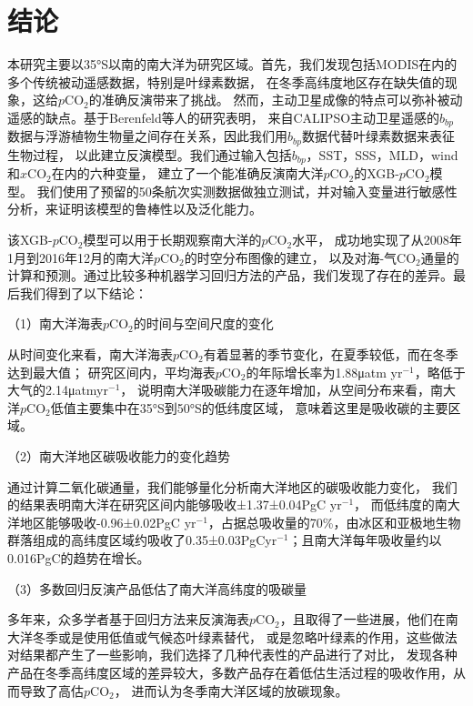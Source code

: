\section{结论}
本研究主要以35°S以南的南大洋为研究区域。首先，我们发现包括MODIS在内的多个传统被动遥感数据，特别是叶绿素数据，
在冬季高纬度地区存在缺失值的现象，这给$p\mathrm{CO_2}$的准确反演带来了挑战。
然而，主动卫星成像的特点可以弥补被动遥感的缺点。基于Berenfeld等人\cite{bbp_Annual_2017,chen2017estimating}的研究表明，
来自CALIPSO主动卫星遥感的$b_{bp}$数据与浮游植物生物量之间存在关系，因此我们用$b_{bp}$数据代替叶绿素数据来表征生物过程，
以此建立反演模型。我们通过输入包括$b_{bp}$，SST，SSS，MLD，wind和$x\mathrm{CO_2}$在内的六种变量，
建立了一个能准确反演南大洋$p\mathrm{CO_2}$的XGB-$p\mathrm{CO_2}$模型。
我们使用了预留的50条航次实测数据做独立测试，并对输入变量进行敏感性分析，来证明该模型的鲁棒性以及泛化能力。

该XGB-$p\mathrm{CO_2}$模型可以用于长期观察南大洋的$p\mathrm{CO_2}$水平，
成功地实现了从2008年1月到2016年12月的南大洋$p\mathrm{CO_2}$的时空分布图像的建立，
以及对海-气$\mathrm{CO_2}$通量的计算和预测。通过比较多种机器学习回归方法的产品，我们发现了存在的差异。最后我们得到了以下结论：

（1）南大洋海表$p\mathrm{CO_2}$的时间与空间尺度的变化 

从时间变化来看，南大洋海表$p\mathrm{CO_2}$有着显著的季节变化，在夏季较低，而在冬季达到最大值；
研究区间内，平均海表$p\mathrm{CO_2}$的年际增长率为1.88μatm yr$^{-1}$，略低于大气的2.14μatmyr$^{-1}$，
说明南大洋吸碳能力在逐年增加，从空间分布来看，南大洋$p\mathrm{CO_2}$低值主要集中在35°S到50°S的低纬度区域，
意味着这里是吸收碳的主要区域。

（2）南大洋地区碳吸收能力的变化趋势

通过计算二氧化碳通量，我们能够量化分析南大洋地区的碳吸收能力变化，
我们的结果表明南大洋在研究区间内能够吸收±1.37±0.04PgC yr$^{-1}$，
而低纬度的南大洋地区能够吸收-0.96±0.02PgC yr$^{-1}$，占据总吸收量的70\%，由冰区和亚极地生物群落组成的高纬度区域约吸收了0.35±0.03PgCyr$^{-1}$；且南大洋每年吸收量约以0.016PgC的趋势在增长。

（3）多数回归反演产品低估了南大洋高纬度的吸碳量

多年来，众多学者基于回归方法来反演海表$p\mathrm{CO_2}$，且取得了一些进展，他们在南大洋冬季或是使用低值或气候态叶绿素替代，
或是忽略叶绿素的作用，这些做法对结果都产生了一些影响，我们选择了几种代表性的产品进行了对比，
发现各种产品在冬季高纬度区域的差异较大，多数产品存在着低估生活过程的吸收作用，从而导致了高估$p\mathrm{CO_2}$，
进而认为冬季南大洋区域的放碳现象。


